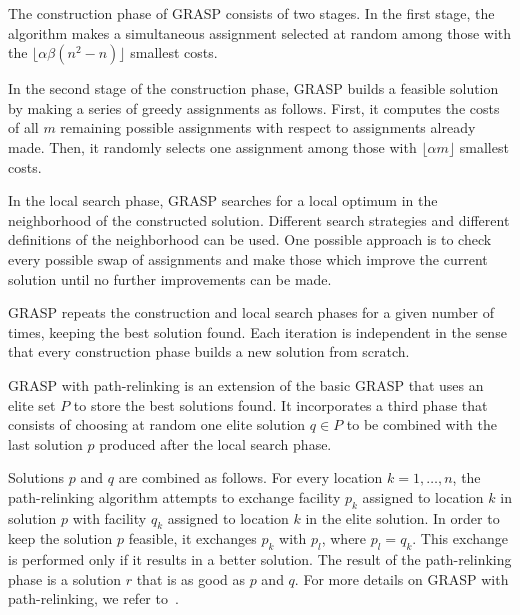 \documentclass[english]{lni}
\newcommand{\ignore}[1]{}
\begin{document}
The construction phase of GRASP consists of two stages. In the first stage,
the algorithm makes a simultaneous assignment selected at random among those
with the $\lfloor \alpha \beta (n^2 - n) \rfloor$ smallest costs.

In the second stage of the construction phase, GRASP builds a feasible
solution by making a series of greedy assignments as follows. First, it
computes the costs of all $m$ remaining possible assignments with respect to
assignments already made. Then, it randomly selects one assignment among those
with $\lfloor \alpha m \rfloor$ smallest costs.

In the local search phase, GRASP searches for a local optimum in the
neighborhood of the constructed solution. Different search strategies and
different definitions of the neighborhood can be used. One possible approach is
to check every possible swap of assignments and make those which improve the
current solution until no further improvements can be made.

GRASP repeats the construction and local search phases for a given number of
times, keeping the best solution found. Each iteration is independent in the
sense that every construction phase builds a new solution from scratch.

\ignore{
The best
solutions are kept, but GRASP takes no advantage of the knowledge gained in
previously iterations to build or improve a new solution. This is exactly where
the concept of path-relinking comes into play.
}

GRASP with path-relinking is an extension of the basic GRASP that uses an elite
set $P$ to store the best solutions found. It incorporates a third phase
that consists of choosing at random one elite solution $q \in P$  to be combined
with the last solution $p$ produced after the local search phase.

Solutions $p$ and $q$ are combined as follows. For every location
$k = 1, \ldots, n$, the path-relinking algorithm attempts to exchange facility
$p_k$ assigned to location $k$ in  solution $p$ with facility $q_k$ assigned to
location $k$ in the elite solution. In order to keep the solution $p$ feasible,
it exchanges $p_k$ with $p_l$, where $p_l = q_k$. This exchange is
performed only if it results in a better solution. The result of the
path-relinking phase is a solution $r$ that is as good as $p$ and $q$.
For more details on GRASP with path-relinking, we refer to~\cite{OLIVEIRA04}.

\end{document}
